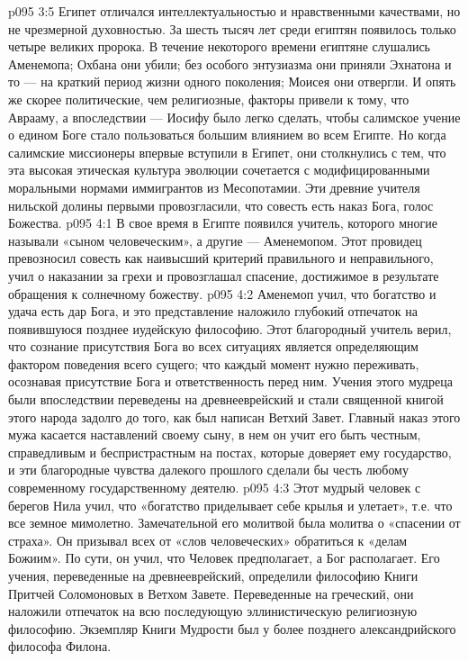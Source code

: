 \vs p095 3:5 \pc Египет отличался интеллектуальностью и нравственными качествами, но не чрезмерной духовностью. За шесть тысяч лет среди египтян появилось только четыре великих пророка. В течение некоторого времени египтяне слушались Аменемопа; Охбана они убили; без особого энтузиазма они приняли Эхнатона и то --- на краткий период жизни одного поколения; Моисея они отвергли. И опять же скорее политические, чем религиозные, факторы привели к тому, что Аврааму, а впоследствии --- Иосифу было легко сделать, чтобы салимское учение о едином Боге стало пользоваться большим влиянием во всем Египте. Но когда салимские миссионеры впервые вступили в Египет, они столкнулись с тем, что эта высокая этическая культура эволюции сочетается с модифицированными моральными нормами иммигрантов из Месопотамии. Эти древние учителя нильской долины первыми провозгласили, что совесть есть наказ Бога, голос Божества.
\vs p095 4:1 В свое время в Египте появился учитель, которого многие называли «сыном человеческим», а другие --- Аменемопом. Этот провидец превозносил совесть как наивысший критерий правильного и неправильного, учил о наказании за грехи и провозглашал спасение, достижимое в результате обращения к солнечному божеству.
\vs p095 4:2 Аменемоп учил, что богатство и удача есть дар Бога, и это представление наложило глубокий отпечаток на появившуюся позднее иудейскую философию. Этот благородный учитель верил, что сознание присутствия Бога во всех ситуациях является определяющим фактором поведения всего сущего; что каждый момент нужно переживать, осознавая присутствие Бога и ответственность перед ним. Учения этого мудреца были впоследствии переведены на древнееврейский и стали священной книгой этого народа задолго до того, как был написан Ветхий Завет. Главный наказ этого мужа касается наставлений своему сыну, в нем он учит его быть честным, справедливым и беспристрастным на постах, которые доверяет ему государство, и эти благородные чувства далекого прошлого сделали бы честь любому современному государственному деятелю.
\vs p095 4:3 Этот мудрый человек с берегов Нила учил, что «богатство приделывает себе крылья и улетает», т.е. что все земное мимолетно. Замечательной его молитвой была молитва о «спасении от страха». Он призывал всех от «слов человеческих» обратиться к «делам Божиим». По сути, он учил, что Человек предполагает, а Бог располагает. Его учения, переведенные на древнееврейский, определили философию Книги Притчей Соломоновых в Ветхом Завете. Переведенные на греческий, они наложили отпечаток на всю последующую эллинистическую религиозную философию. Экземпляр Книги Мудрости был у более позднего александрийского философа Филона.
